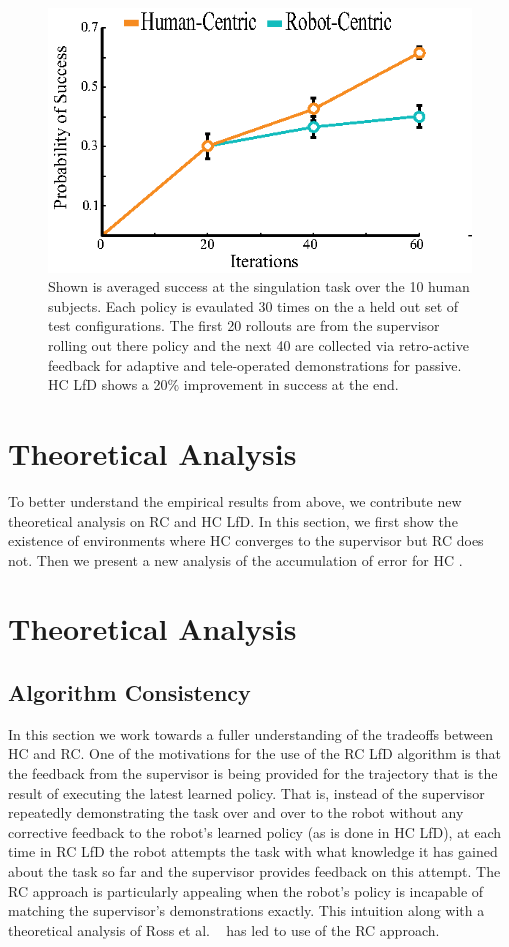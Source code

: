 \documentclass[10pt, conference]{ieeeconf}      %
\newcommand{\ns}{HC }
\begin{document}
\begin{figure}
\centering
\includegraphics{f_figs/izzy_reward.eps}
\caption{
    \footnotesize
Shown is averaged success at the singulation task over the 10 human subjects. Each policy is evaulated 30 times on the a held out set of test configurations. The first 20 rollouts are from the supervisor rolling out there policy and the next 40 are collected via retro-active feedback for adaptive and tele-operated demonstrations for passive. HC LfD shows a 20$\%$ improvement in success at the end. }

\label{fig:izzy_rw}
\end{figure}


\section{Theoretical Analysis}
To better understand the empirical results from above, we contribute new theoretical analysis on RC and HC LfD. In this section, we first show the existence of environments where HC converges to the supervisor but RC does not. Then we present a new analysis of the accumulation of error for \ns. 


\section{Theoretical Analysis} 

\subsection{Algorithm Consistency}\label{sec:consistent}
In this section we work towards a fuller understanding of the tradeoffs between HC and RC. 
One of the motivations for the use of the RC LfD algorithm is that the feedback from the supervisor is being provided for the trajectory that is the result of executing the latest learned policy.
That is, instead of the supervisor repeatedly demonstrating the task over and over to the robot without any corrective feedback to the robot's learned policy (as is done in HC LfD), at each time in RC LfD the robot attempts the task with what knowledge it has gained about the task so far and the supervisor provides feedback on this attempt. 
The RC approach is particularly appealing when the robot's policy is incapable of matching the supervisor's demonstrations exactly.  
This intuition along with a theoretical analysis of Ross et al. ~\cite{ross2010reduction} has led to use of the RC approach.
\end{document}
